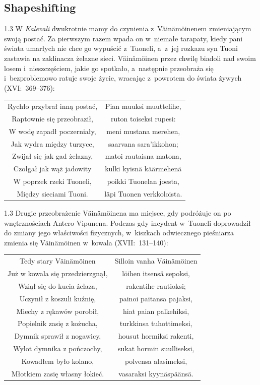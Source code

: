 \documentclass[11pt,a4paper,twoside]{report}
\begin{document}
\subsection*{Shapeshifting}
\begin{spacing}{1.3}
W \emph{Kalevali} dwukrotnie mamy do czynienia z~Väinämöinenem zmieniającym swoją postać. Za pierwszym razem wpada on w~niemałe tarapaty, kiedy pani świata umarłych nie chce go wypuścić z~Tuoneli, a~z~jej rozkazu syn Tuoni zastawia na zaklinacza żelazne sieci. Väinämöinen przez chwilę biadoli nad swoim losem i~nieszczęściem, jakie go spotkało, a~następnie przeobraża się i~bezproblemowo ratuje swoje życie, wracając z~powrotem do świata żywych (XVI:~369--376):
\end{spacing}
{\centering
\small
\begin{longtable}{c c}
Rychło przybrał inną postać, & Pian muuksi muuttelihe,\\
Raptownie się przeobraził, & ruton toiseksi rupesi:\\
W wodę zapadł poczerniały, & meni mustana merehen,\\
Jak wydra między turzyce, & saarvana sara'ikkohon;\\
Zwijał się jak gad żelazny, & matoi rautaisna matona,\\
Czołgał jak wąż jadowity & kulki kyisnä käärmehenä\\
W poprzek rzeki Tuoneli, & poikki Tuonelan joesta,\\
Między sieciami Tuoni. & läpi Tuonen verkkoloista.\\
\end{longtable}
}
\begin{spacing}{1.3}
Drugie przeobrażenie Väinämöinena ma miejsce, gdy podróżuje on po wnętrznościach Antero Vipunena. Podczas gdy incydent w~Tuoneli doprowadził do zmiany jego właściwości fizycznych, w~kiszkach odwiecznego pieśniarza zmienia się Väinämöinen w~kowala (XVII:~131--140):
\end{spacing}
{\centering
\small
\begin{longtable}{c c}
Tedy stary Väinämöinen & Silloin vanha Väinämöinen\\
Już w kowala się przedzierzgnął, & löihen itsensä sepoksi, \\
Wziął się do kucia żelaza, & rakentihe rautioksi;\\
Uczynił z koszuli kuźnię, & painoi paitansa pajaksi,\\
Miechy z rękawów porobił, & hiat paian palkehiksi,\\
Popielnik zasię z kożucha, & turkkinsa tuhottimeksi,\\
Dymnik sprawił z nogawicy, & housut hormiksi rakenti,\\
Wylot dymnika z pończochy, & sukat hormin suulliseksi,\\
Kowadłem było kolano, & polvensa alasimeksi,\\
Młotkiem zasię własny łokieć. & vasaraksi kyynäspäänsä.\\
\end{longtable}
}
\end{document}

